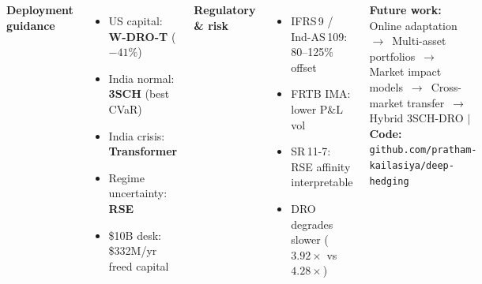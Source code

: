 \documentclass[25pt, a0paper, portrait]{tikzposter}
\begin{document}
\begin{columns}
{\smallskip
\begin{minipage}[t]{0.48\linewidth}
\textbf{\color{NavyPri}Deployment guidance}
\begin{itemize}[leftmargin=1em,itemsep=2pt,labelsep=0.3em,topsep=2pt]
\item[$\triangleright$] US capital: \textbf{W-DRO-T} ($-41\%$)
\item[$\triangleright$] India normal: \textbf{3SCH} (best CVaR)
\item[$\triangleright$] India crisis: \textbf{Transformer}
\item[$\triangleright$] Regime uncertainty: \textbf{RSE}
\item[$\triangleright$] \$10B desk: \$332M/yr freed capital
\end{itemize}
\end{minipage}
\hfill
\begin{minipage}[t]{0.48\linewidth}
\textbf{\color{NavyPri}Regulatory \& risk}
\begin{itemize}[leftmargin=1em,itemsep=2pt,labelsep=0.3em,topsep=2pt]
\item[\textcolor{GreenOK}{\ding{51}}] IFRS\,9 / Ind-AS\,109: 80--125\% offset
\item[\textcolor{GreenOK}{\ding{51}}] FRTB IMA: lower P\&L vol
\item[\textcolor{GreenOK}{\ding{51}}] SR\,11-7: RSE affinity interpretable
\item[\textcolor{GreenOK}{\ding{51}}] DRO degrades slower ($3.92\!\times$ vs $4.28\!\times$)
\end{itemize}
\end{minipage}

\bigskip
{\small\color{SlateSecond}
\textbf{Future work:}\;
Online adaptation \,$\to$\,
Multi-asset portfolios \,$\to$\,
Market impact models \,$\to$\,
Cross-market transfer \,$\to$\,
Hybrid 3SCH-DRO
\quad$\vert$\quad
\textbf{Code:} \texttt{github.com/pratham-kailasiya/deep-hedging}}
}

\end{columns}
\end{document}
